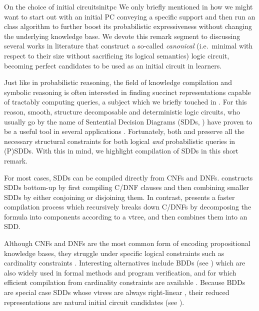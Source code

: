 \begin{remark}[breakable]{On the choice of initial circuits}{initpc}
  We only briefly mentioned in  how we might want to start out with an
  initial PC conveying a specific support and then run an \incrclass{} class algorithm to further
  boost its probabilistic expressiveness without changing the underlying knowledge base. We devote
  this remark segment to discussing several works in literature that construct a so-called
  \emph{canonical} (i.e.\ minimal with respect to their size without sacrificing its logical
  semantics) logic circuit, becoming perfect candidates to be used as an initial circuit in
  \incrclass{} learners.

  Just like in probabilistic reasoning, the field of knowledge compilation and symbolic reasoning
  is often interested in finding succinct representations capable of tractably computing queries, a
  subject which we briefly touched in . For this reason, smooth,
  structure decomposable and deterministic logic circuits, who usually go by the name of Sentential
  Decision Diagrams (SDDs, \cite{darwiche11}) have proven to be a useful tool in several
  applications \citep{vlasselaer14,vlasselaer15,lomuscio15,herrmann13}. Fortunately, both
   and  preserve all the necessary structural constraints for
  both logical \emph{and} probabilistic queries in (P)SDDs. With this in mind, we highlight
  compilation of SDDs in this short remark.

  For most cases, SDDs can be compiled directly from CNFs and DNFs. \citep{choi13} constructs SDDs
  bottom-up by first compiling C/DNF clauses and then combining smaller SDDs by either conjoining
  or disjoining them. In contrast, \citep{oztok15} presents a faster compilation process which
  recursively breaks down C/DNFs by decomposing the formula into components according to a vtree,
  and then combines them into an SDD.

  Although CNFs and DNFs are the most common form of encoding propositional knowledge bases, they
  struggle under specific logical constraints such as cardinality constraints
  \citep{nishino16,sinz05}. Interesting alternatives include BDDs (see ) which are
  also widely used in formal methods and program verification, and for which efficient compilation
  from cardinality constraints are available \citep{een06}. Because BDDs are special case SDDs
  whose vtrees are always right-linear \citep{darwiche11,bova16}, their reduced representations
  \citep{bryant86} are natural initial circuit candidates (see ).


\end{remark}
